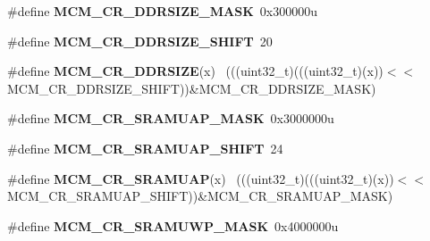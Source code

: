 \begin{DoxyCompactItemize}
\item 
\hypertarget{group___m_c_m___register___masks_gaf5c6f4bc8dc09a3afa5cfabbdc0fad5f}{}\#define {\bfseries M\+C\+M\+\_\+\+C\+R\+\_\+\+D\+D\+R\+S\+I\+Z\+E\+\_\+\+M\+A\+S\+K}~0x300000u\label{group___m_c_m___register___masks_gaf5c6f4bc8dc09a3afa5cfabbdc0fad5f}

\item 
\hypertarget{group___m_c_m___register___masks_ga8dbaf9d888a27a37c8ff91cda277c662}{}\#define {\bfseries M\+C\+M\+\_\+\+C\+R\+\_\+\+D\+D\+R\+S\+I\+Z\+E\+\_\+\+S\+H\+I\+F\+T}~20\label{group___m_c_m___register___masks_ga8dbaf9d888a27a37c8ff91cda277c662}

\item 
\hypertarget{group___m_c_m___register___masks_ga4483ab46bea95b82ab0179b9ca6c0efc}{}\#define {\bfseries M\+C\+M\+\_\+\+C\+R\+\_\+\+D\+D\+R\+S\+I\+Z\+E}(x)                                            ~(((uint32\+\_\+t)(((uint32\+\_\+t)(x))$<$$<$M\+C\+M\+\_\+\+C\+R\+\_\+\+D\+D\+R\+S\+I\+Z\+E\+\_\+\+S\+H\+I\+F\+T))\&M\+C\+M\+\_\+\+C\+R\+\_\+\+D\+D\+R\+S\+I\+Z\+E\+\_\+\+M\+A\+S\+K)\label{group___m_c_m___register___masks_ga4483ab46bea95b82ab0179b9ca6c0efc}

\item 
\hypertarget{group___m_c_m___register___masks_ga39213f9a00cf1862ab3e77c839e71c78}{}\#define {\bfseries M\+C\+M\+\_\+\+C\+R\+\_\+\+S\+R\+A\+M\+U\+A\+P\+\_\+\+M\+A\+S\+K}~0x3000000u\label{group___m_c_m___register___masks_ga39213f9a00cf1862ab3e77c839e71c78}

\item 
\hypertarget{group___m_c_m___register___masks_ga4608d3fb1b05eb0d37515c4686f6190c}{}\#define {\bfseries M\+C\+M\+\_\+\+C\+R\+\_\+\+S\+R\+A\+M\+U\+A\+P\+\_\+\+S\+H\+I\+F\+T}~24\label{group___m_c_m___register___masks_ga4608d3fb1b05eb0d37515c4686f6190c}

\item 
\hypertarget{group___m_c_m___register___masks_ga20439b64822acaa2e80c35f0ac3ef4c6}{}\#define {\bfseries M\+C\+M\+\_\+\+C\+R\+\_\+\+S\+R\+A\+M\+U\+A\+P}(x)                                            ~(((uint32\+\_\+t)(((uint32\+\_\+t)(x))$<$$<$M\+C\+M\+\_\+\+C\+R\+\_\+\+S\+R\+A\+M\+U\+A\+P\+\_\+\+S\+H\+I\+F\+T))\&M\+C\+M\+\_\+\+C\+R\+\_\+\+S\+R\+A\+M\+U\+A\+P\+\_\+\+M\+A\+S\+K)\label{group___m_c_m___register___masks_ga20439b64822acaa2e80c35f0ac3ef4c6}

\item 
\hypertarget{group___m_c_m___register___masks_ga80116d649929d7c9ad773cebd4e4c3bb}{}\#define {\bfseries M\+C\+M\+\_\+\+C\+R\+\_\+\+S\+R\+A\+M\+U\+W\+P\+\_\+\+M\+A\+S\+K}~0x4000000u\label{group___m_c_m___register___masks_ga80116d649929d7c9ad773cebd4e4c3bb}


\end{DoxyCompactItemize}
